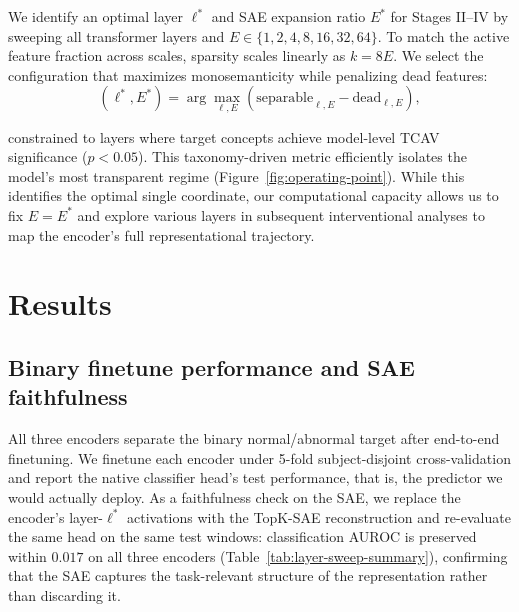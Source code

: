 \documentclass{article}
\begin{document}
We identify an optimal layer $\ell^*$ and SAE expansion ratio $E^*$ for Stages II--IV by sweeping all transformer layers and $E \in \{1, 2, 4, 8, 16, 32, 64\}$. To match the active feature fraction across scales, sparsity scales linearly as $k = 8E$. We select the configuration that maximizes monosemanticity while penalizing dead features:
\begin{equation}
    (\ell^*, E^*) = \arg\max_{\ell, E} \left( \mathrm{separable}_{\ell,E} - \mathrm{dead}_{\ell,E} \right),
\label{eq:operating_point}
\end{equation}

constrained to layers where target concepts achieve model-level TCAV significance ($p < 0.05$). This taxonomy-driven metric efficiently isolates the model's most transparent regime (Figure~\ref{fig:operating-point}). While this identifies the optimal single coordinate, our computational capacity allows us to fix $E = E^*$ and explore various layers in subsequent interventional analyses to map the encoder's full representational trajectory.


\section{Results}

\subsection{Binary finetune performance and SAE faithfulness}

All three encoders separate the binary normal/abnormal target after end-to-end finetuning. We finetune each encoder under 5-fold subject-disjoint cross-validation and report the native classifier head's test performance, that is, the predictor we would actually deploy. As a faithfulness check on the SAE, we replace the encoder's layer-$\ell^*$ activations with the TopK-SAE reconstruction and re-evaluate the same head on the same test windows: classification AUROC is preserved within $0.017$ on all three encoders (Table~\ref{tab:layer-sweep-summary}), confirming that the SAE captures the task-relevant structure of the representation rather than discarding it.
\end{document}
